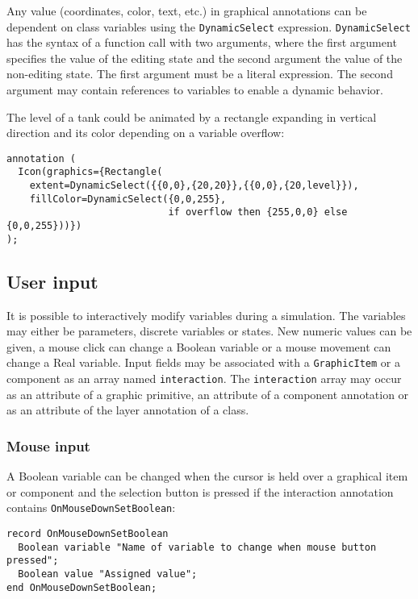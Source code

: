 Any value (coordinates, color, text, etc.) in graphical annotations can
be dependent on class variables using the \lstinline!DynamicSelect! expression.
\lstinline!DynamicSelect! has the syntax of a function call with two arguments,
where the first argument specifies the value of the editing state and
the second argument the value of the non-editing state. The first
argument must be a literal expression. The second argument may contain
references to variables to enable a dynamic behavior.

\begin{example}
The level of a tank could be animated by a
rectangle expanding in vertical direction and its color depending on a
variable overflow:
\begin{lstlisting}[language=modelica]
annotation (
  Icon(graphics={Rectangle(
    extent=DynamicSelect({{0,0},{20,20}},{{0,0},{20,level}}),
    fillColor=DynamicSelect({0,0,255},
                            if overflow then {255,0,0} else {0,0,255}))})
);
\end{lstlisting}
\end{example}

\subsection{User input}\label{user-input}

It is possible to interactively modify variables during a simulation.
The variables may either be parameters, discrete variables or states.
New numeric values can be given, a mouse click can change a Boolean
variable or a mouse movement can change a Real variable. Input fields
may be associated with a \lstinline!GraphicItem! or a component as an array named
\lstinline!interaction!. The \lstinline!interaction! array may occur as an attribute of a
graphic primitive, an attribute of a component annotation or as an
attribute of the layer annotation of a class.

\subsubsection{Mouse input}\label{mouse-input}

A Boolean variable can be changed when the cursor is held over a
graphical item or component and the selection button is pressed if the
interaction annotation contains \lstinline!OnMouseDownSetBoolean!:
\begin{lstlisting}[language=modelica]
record OnMouseDownSetBoolean
  Boolean variable "Name of variable to change when mouse button pressed";
  Boolean value "Assigned value";
end OnMouseDownSetBoolean;
\end{lstlisting}

